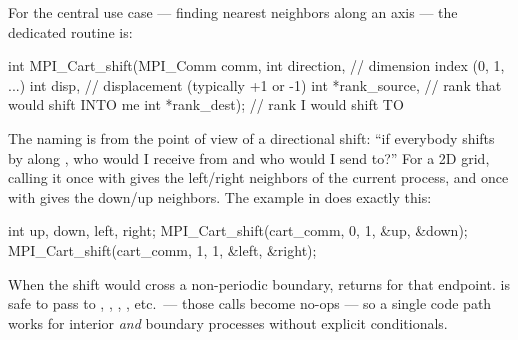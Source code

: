 For the central use case --- finding nearest neighbors along an axis --- the dedicated routine is:

\begin{codeblock}[language=C]
int MPI_Cart_shift(MPI_Comm comm,
                   int direction,    // dimension index (0, 1, ...)
                   int disp,         // displacement (typically +1 or -1)
                   int *rank_source, // rank that would shift INTO me
                   int *rank_dest);  // rank I would shift TO
\end{codeblock}

The naming is from the point of view of a directional shift: ``if everybody shifts by  along , who would I receive from and who would I send to?'' For a 2D grid, calling it once with  gives the left/right neighbors of the current process, and once with  gives the down/up neighbors. The example in  does exactly this:

\begin{codeblock}[language=C]
int up, down, left, right;
MPI_Cart_shift(cart_comm, 0, 1, &up,   &down);
MPI_Cart_shift(cart_comm, 1, 1, &left, &right);
\end{codeblock}

When the shift would cross a non-periodic boundary,  returns  for that endpoint.  is safe to pass to , , , , etc.\ --- those calls become no-ops --- so a single code path works for interior \emph{and} boundary processes without explicit conditionals.


